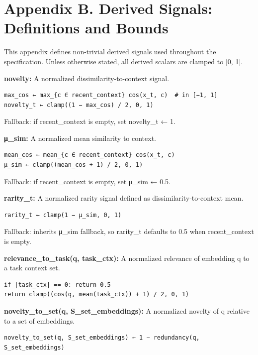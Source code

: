 \documentclass[
  letterpaper,
  DIV=11,
  numbers=noendperiod]{scrartcl}
\begin{document}
\section*{Appendix B. Derived Signals: Definitions and
Bounds}\label{sec-app-derived}

This appendix defines non-trivial derived signals used throughout the
specification. Unless otherwise stated, all derived scalars are clamped
to {[}0, 1{]}.

\textbf{novelty:} A normalized dissimilarity-to-context signal.

\begin{verbatim}
max_cos ← max_{c ∈ recent_context} cos(x_t, c)  # in [−1, 1]
novelty_t ← clamp((1 − max_cos) / 2, 0, 1)
\end{verbatim}

Fallback: if recent\_context is empty, set novelty\_t ← 1.

\textbf{μ\_sim:} A normalized mean similarity to context.

\begin{verbatim}
mean_cos ← mean_{c ∈ recent_context} cos(x_t, c)
μ_sim ← clamp((mean_cos + 1) / 2, 0, 1)
\end{verbatim}

Fallback: if recent\_context is empty, set μ\_sim ← 0.5.

\textbf{rarity\_t:} A normalized rarity signal defined as
dissimilarity-to-context mean.

\begin{verbatim}
rarity_t ← clamp(1 − μ_sim, 0, 1)
\end{verbatim}

Fallback: inherits μ\_sim fallback, so rarity\_t defaults to 0.5 when
recent\_context is empty.

\textbf{relevance\_to\_task(q, task\_ctx):} A normalized relevance of
embedding q to a task context set.

\begin{verbatim}
if |task_ctx| == 0: return 0.5
return clamp((cos(q, mean(task_ctx)) + 1) / 2, 0, 1)
\end{verbatim}

\textbf{novelty\_to\_set(q, S\_set\_embeddings):} A normalized novelty
of q relative to a set of embeddings.

\begin{verbatim}
novelty_to_set(q, S_set_embeddings) ← 1 − redundancy(q, S_set_embeddings)
\end{verbatim}
\end{document}
